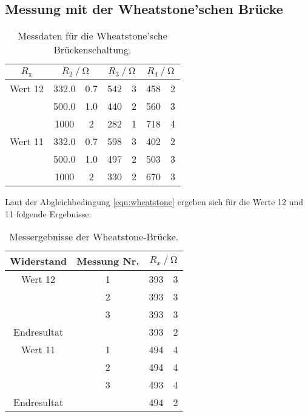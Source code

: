 \subsection{Messung mit der Wheatstone'schen Brücke}
\FloatBarrier
    \begin{table}
        \centering
        \caption{Messdaten für die Wheatstone'sche Brückenschaltung.}
        \label{tab:wheat}
        \begin{tabular}{c S[table-format=4.1] @{${}\pm{}$} S[table-format=1.1] S[table-format=3.0] @{${}\pm{}$} S[table-format=1.0] S[table-format=3.0] @{${}\pm{}$} S[table-format=1.0]}
            \toprule
            {$R_\text{x}$} &  &  &  \\
            \midrule
            Wert 12 & 332.0 & 0.7   & 542 & 3 & 458 & 2 \\
                    & 500.0 & 1.0   & 440 & 2 & 560 & 3 \\
                    & 1000  & 2     & 282 & 1 & 718 & 4 \\
            Wert 11 & 332.0 & 0.7   & 598 & 3 & 402 & 2 \\
                    & 500.0 & 1.0   & 497 & 2 & 503 & 3 \\
                    & 1000  & 2     & 330 & 2 & 670 & 3 \\
            \bottomrule
        \end{tabular}
    \end{table}
    Laut der Abgleichbedingung \ref{eqn:wheatstone}
    ergeben sich für die Werte 12 und 11 folgende Ergebnisse:
    \begin{table}
        \centering
        \caption{Messergebnisse der Wheatstone-Brücke.}
        \label{tab:resultwheat}
        \begin{tabular}{c c S[table-format=3.0] @{${}\pm{}$} S[table-format=1.0]}
            \toprule
            {Widerstand} & {Messung Nr.} &  \\
            \midrule
            Wert 12 & 1 & 393 & 3 \\
                    & 2 & 393 & 3 \\
                    & 3 & 393 & 3 \\
            Endresultat&   & 393 & 2 \\
            Wert 11 & 1 & 494 & 4 \\
                    & 2 & 494 & 4 \\
                    & 3 & 493 & 4 \\
            Endresultat&   & 494 & 2 \\
            \bottomrule
        \end{tabular}
    \end{table}
\FloatBarrier

